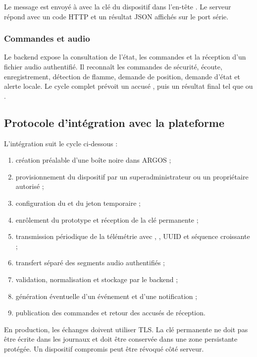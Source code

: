 Le message est envoyé à  avec la clé du dispositif
dans l'en-tête . Le serveur répond avec un code HTTP et un
résultat JSON affichés sur le port série.

\subsubsection{Commandes et audio}

Le backend expose la consultation de l'état, les commandes et la réception
d'un fichier audio authentifié. Il reconnaît les commandes
de sécurité, écoute, enregistrement, détection de flamme, demande de position,
demande d'état et alerte locale. Le cycle complet prévoit un accusé
, puis un résultat final tel que  ou
.

\subsection{Protocole d'intégration avec la plateforme}

L'intégration suit le cycle ci-dessous :
\begin{enumerate}
    \item création préalable d'une boîte noire dans ARGOS ;
    \item provisionnement du dispositif par un superadministrateur ou un
    propriétaire autorisé ;
    \item configuration du  et du jeton temporaire ;
    \item enrôlement du prototype et réception de la clé permanente ;
    \item transmission périodique de la télémétrie avec
    , , UUID et séquence croissante ;
    \item transfert séparé des segments audio authentifiés ;
    \item validation, normalisation et stockage par le backend ;
    \item génération éventuelle d'un événement et d'une notification ;
    \item publication des commandes et retour des accusés de réception.
\end{enumerate}

En production, les échanges doivent utiliser TLS. La clé permanente ne doit
pas être écrite dans les journaux et doit être conservée dans une zone
persistante protégée. Un dispositif compromis peut être révoqué côté serveur.

